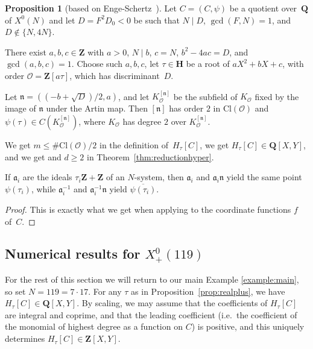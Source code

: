 \documentclass{amsart}
\newcommand{\QQ}{\mathbf{Q}}
\newcommand{\HH}{\mathbf{H}}
\newcommand{\ZZ}{\mathbf{Z}}
\newcommand{\F}{H_\tau[\curve]}
\newcommand{\Cl}{\mathrm{Cl}}
\newcommand{\mc}{\mathcal}
\newcommand{\fraka}{\mathfrak{a}}
\newcommand{\xnul}[1]{X^0(#1)}
\newcommand{\xnulN}{\xnul{N}}
\newcommand{\xplus}[1]{X^0_+(#1)}
\newcommand{\curve}{C}
\numberwithin{equation}{section}
\theoremstyle{definition}
\newtheorem{proposition}[equation]{Proposition}
\begin{document}
\begin{proposition}[based on Enge-Schertz~\cite{enge-schertz2013}]
	\label{prop:ramifiedsubfield}
	Let $C = (C, \psi)$ be a quotient over~$\QQ$ of $\xnulN$
	and let $D=F^2D_0<0$ be such that $N\mid D$,
	$\gcd(F,N)=1$, and $D\not\in\{N,4N\}$.
	
	There exist $a,b,c\in\ZZ$ with $a>0$,
	$N\mid b$, $c=N$, $b^2-4ac = D$,
	and $\gcd(a,b,c) = 1$.
	Choose such $a, b,c$,
	let $\tau\in\HH$ be a root of $aX^2 + bX + c$,
	with order
	$\mc{O} = \ZZ[a\tau]$, which
	has discriminant~$D$.
	
	Let $\mathfrak{n} = ((-b+\sqrt{D})/2, a)$,
	and let $K_{\mc{O}}^{[\mathfrak{n}]}$ be the subfield
	of $K_{\mc{O}}$ fixed by the image of $\mathfrak{n}$ under the
	Artin map.
	Then $[\mathfrak{n}]$ has order $2$ in $\Cl(\mc{O})$
	and $\psi(\tau)\in C(K_{\mc{O}}^{[\mathfrak{n}]})$,
	where $K_{\mc{O}}$ has degree $2$ over
	$K_{\mc{O}}^{[\mathfrak{n}]}$.

	We get $m \leq \#\Cl(\mc{O})/2$ in the definition of~$\F$,
	we get $\F\in\QQ[X,Y]$, and we get
	and $d\geq 2$ in Theorem~\ref{thm:reductionhyper}.
	
	If $\mathfrak{a}_i$ are the ideals $\tau_i\ZZ+\ZZ$
	of an $N$-system, then $\fraka_i$ 
	and $\fraka_i\mathfrak{n}$ yield the same point
	$\psi(\tau_i)$, while $\fraka_i^{-1}$ 
	and $\fraka_i^{-1}\mathfrak{n}$ yield
	$\overline{\psi(\tau_i)}$.
\end{proposition}
\begin{proof}
	This is exactly what we get when applying
	\cite[Theorem~9]{enge-schertz2013}
	to the coordinate functions $f$ of~$C$.
\end{proof}



\subsection{\texorpdfstring{Numerical results for $\xplus{119}$}{Numerical results for X0+(119)}}\label{ssec:x0119}


For the rest of this section we will return to our main Example \ref{example:main}, so set $N=119=7\cdot 17$.
For any $\tau$ as in Proposition~\ref{prop:realplus}, we have
$H_{\tau}[C]\in \QQ[X,Y]$.
By scaling, we may assume that the coefficients of $H_{\tau}[C]$ are integral and coprime,
and that the leading coefficient
(i.e.\ the coefficient of the monomial of highest degree as a function on $C$)
is positive,
and this uniquely determines $H_{\tau}[C]\in\ZZ[X,Y]$.
\end{document}
